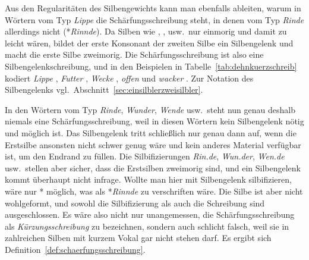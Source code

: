 Aus den Regularitäten des Silbengewichts kann man ebenfalls ableiten, warum in Wörtern vom Typ \textit{Lippe} die Schärfungsschreibung steht, in denen vom Typ \textit{Rinde} allerdings nicht (*\textit{Rinnde}).
Da Silben wie \textipa{[lI]}, \textipa{[fU]}, \textipa{[vE]} usw.\ nur einmorig und damit zu leicht wären, bildet der erste Konsonant der zweiten Silbe ein Silbengelenk und macht die erste Silbe zweimorig.
Die Schärfungsschreibung ist also eine Silbengelenkschreibung, und in den Beispielen in Tabelle~\ref{tab:dehnkuerzschreib} kodiert \textit{Lippe} \textipa{[lI\Sgel{p}@]}, \textit{Futter} \textipa{[fU\Sgel{t}5]}, \textit{Wecke} \textipa{[vE\Sgel{k}@]}, \textit{offen} \textipa{[O\Sgel{f}@n]} und \textit{wacker} \textipa{[va\Sgel{k}5]}.
Zur Notation des Silbengelenks vgl.\ Abschnitt~\ref{sec:einsilblerzweisilbler}.

In den Wörtern vom Typ \textit{Rinde}, \textit{Wunder}, \textit{Wende} usw.\ steht nun genau deshalb niemals eine Schärfungsschreibung, weil in diesen Wörtern kein Silbengelenk nötig und möglich ist.
Das Silbengelenk tritt schließlich nur genau dann auf, wenn die Erstsilbe ansonsten nicht schwer genug wäre und kein anderes Material verfügbar ist, um den Endrand zu füllen.
Die Silbifizierungen \textit{Rin.de}, \textit{Wun.der}, \textit{Wen.de} usw.\ stellen aber sicher, dass die Erstsilben zweimorig sind, und ein Silbengelenk kommt überhaupt nicht infrage.
Wollte man hier mit Silbengelenk silbifizieren, wäre nur *\textipa{[KI\Sgel{n}d@]} möglich, was als *\textit{Rinnde} zu verschriften wäre.
Die Silbe \textipa{[nd@]} ist aber nicht wohlgeformt, und sowohl die Silbifizierung als auch die Schreibung sind ausgeschlossen.
Es wäre also nicht nur unangemessen, die Schärfungsschreibung als \textit{Kürzungsschreibung} zu bezeichnen, sondern auch schlicht falsch, weil sie in zahlreichen Silben mit kurzem Vokal gar nicht stehen darf.
Es ergibt sich Definition~\ref{def:schaerfungsschreibung}.

\Enl


